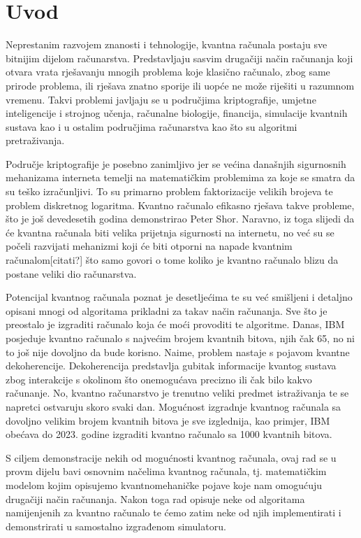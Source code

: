 \chapter{Uvod}
\label{ch:uvod}
Neprestanim razvojem znanosti i tehnologije, kvantna računala postaju sve bitnijim dijelom računarstva. Predstavljaju sasvim drugačiji način računanja koji otvara vrata rješavanju mnogih problema koje klasično računalo, zbog same prirode problema, ili rješava znatno sporije ili uopće ne može riješiti u razumnom vremenu. Takvi problemi javljaju se u područjima kriptografije, umjetne inteligencije i strojnog učenja, računalne biologije, financija, simulacije kvantnih sustava kao i u ostalim područjima računarstva kao što su algoritmi pretraživanja.

Područje kriptografije je posebno zanimljivo jer se većina današnjih sigurnosnih mehanizama interneta temelji na matematičkim problemima za koje se smatra da su teško izračunljivi. To su primarno problem faktorizacije velikih brojeva te problem diskretnog logaritma. Kvantno računalo efikasno rješava takve probleme, što je još devedesetih godina demonstrirao Peter Shor\citep{Shor:1994jg}. Naravno, iz toga slijedi da će kvantna računala biti velika prijetnja sigurnosti na internetu, no već su se počeli razvijati mehanizmi koji će biti otporni na napade kvantnim računalom[citati?] što  samo govori o tome koliko je kvantno računalo blizu da postane veliki dio računarstva.

Potencijal kvantnog računala poznat je desetljećima te su već smišljeni i detaljno opisani mnogi od algoritama prikladni za takav način računanja. Sve što je preostalo je izgraditi računalo koja će moći provoditi te algoritme. Danas, IBM posjeduje kvantno računalo s najvećim brojem kvantnih bitova, njih čak 65, no ni to još nije dovoljno da bude korisno. Naime, problem nastaje s pojavom kvantne dekoherencije. Dekoherencija predstavlja gubitak informacije kvantog sustava zbog interakcije s okolinom što onemogućava precizno ili čak bilo kakvo računanje. No, kvantno računarstvo je trenutno veliki predmet istraživanja te se napretci ostvaruju skoro svaki dan. Mogućnost izgradnje kvantnog računala sa dovoljno velikim brojem kvantnih bitova je sve izglednija, kao primjer, IBM obećava do 2023. godine izgraditi kvantno računalo sa 1000 kvantnih bitova\citep{ibm:quantum}.

S ciljem demonstracije nekih od mogućnosti kvantnog računala, ovaj rad se u provm dijelu bavi osnovnim načelima kvantnog računala, tj. matematičkim modelom kojim opisujemo kvantnomehaničke pojave koje nam omogućuju drugačiji način računanja. Nakon toga rad opisuje neke od algoritama namijenjenih za kvantno računalo te ćemo zatim neke od njih implementirati i demonstrirati u samostalno izgrađenom simulatoru.